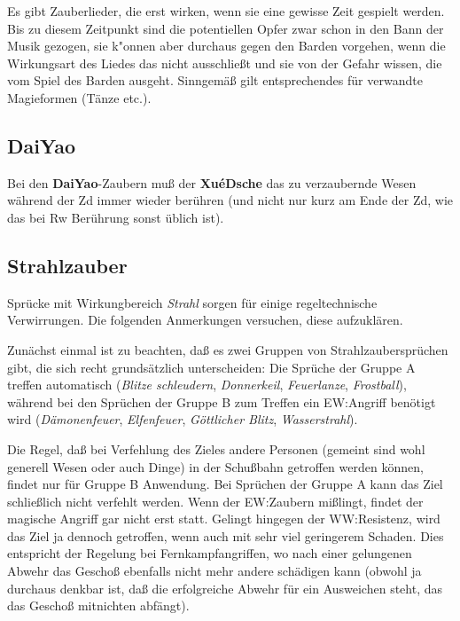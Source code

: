 \documentclass[10pt,a4paper,germanpar]{article}
\begin{document}
Es gibt Zauberlieder, die erst wirken, wenn sie eine gewisse Zeit
gespielt werden. Bis zu diesem Zeitpunkt sind die potentiellen Opfer
zwar schon in den Bann der Musik gezogen, sie k"onnen aber durchaus
gegen den Barden vorgehen, wenn die Wirkungsart des Liedes das nicht
ausschließt und sie von der Gefahr wissen, die vom Spiel des Barden
ausgeht. Sinngemäß gilt entsprechendes für verwandte Magieformen
(Tänze etc.).

\subsection{DaiYao}

Bei den \textbf{DaiYao}-Zaubern muß der \textbf{XuéDsche} das zu
verzaubernde Wesen während der Zd immer wieder berühren (und nicht nur
kurz am Ende der Zd, wie das bei Rw Berührung sonst üblich ist).

\subsection{Strahlzauber}
\label{strahlzauber}

Sprücke mit Wirkungbereich \emph{Strahl} sorgen für einige
regeltechnische Verwirrungen. Die folgenden Anmerkungen versuchen,
diese aufzuklären.

Zunächst einmal ist zu beachten, daß es zwei Gruppen von
Strahlzaubersprüchen gibt, die sich recht grundsätzlich unterscheiden:
Die Sprüche der Gruppe A treffen automatisch (\emph{Blitze
  schleudern}, \emph{Donnerkeil}, \emph{Feuerlanze},
\emph{Frostball}), während bei den Sprüchen der Gruppe B zum Treffen
ein EW:Angriff benötigt wird (\emph{Dämonenfeuer}, \emph{Elfenfeuer},
\emph{Göttlicher Blitz}, \emph{Wasserstrahl}).

Die Regel, daß bei Verfehlung des Zieles andere Personen (gemeint sind
wohl generell Wesen oder auch Dinge) in der Schußbahn getroffen werden
können, findet nur für Gruppe B Anwendung. Bei Sprüchen der Gruppe A
kann das Ziel schließlich nicht verfehlt werden. Wenn der EW:Zaubern
mißlingt, findet der magische Angriff gar nicht erst statt. Gelingt
hingegen der WW:Resistenz, wird das Ziel ja dennoch getroffen, wenn
auch mit sehr viel geringerem Schaden. Dies entspricht der Regelung
bei Fernkampfangriffen, wo nach einer gelungenen Abwehr das Geschoß
ebenfalls nicht mehr andere schädigen kann (obwohl ja durchaus denkbar
ist, daß die erfolgreiche Abwehr für ein Ausweichen steht, das das
Geschoß mitnichten abfängt).
\end{document}
